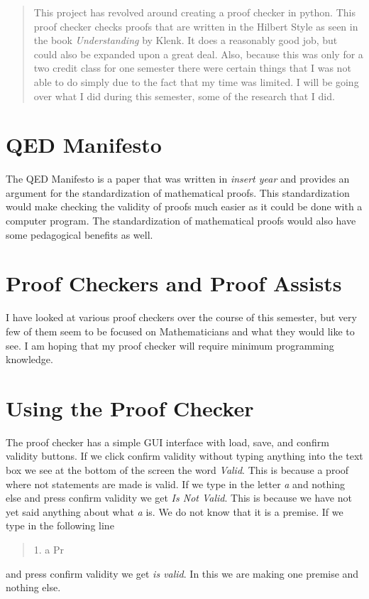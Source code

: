 \documentclass[12pt]{article}
\begin{document}
\begin{abstract}
This project has revolved around creating a proof checker in python. This proof checker checks proofs that are written in the Hilbert Style as seen in the book \emph{Understanding} by Klenk. It does a reasonably good job, but could also be expanded upon a great deal. Also, because this was only for a two credit class for one semester there were certain things that I was not able to do simply due to the fact that my time was limited. I will be going over what I did during this semester, some of the research that I did.
\end{abstract}

\section{QED Manifesto}
The QED Manifesto is a paper that was written in \emph{insert year} and provides an argument for the standardization of mathematical proofs. This standardization would make checking the validity of proofs much easier as it could be done with a computer program. The standardization of mathematical proofs would also have some pedagogical benefits as well. 

\section{Proof Checkers and Proof Assists}
I have looked at various proof checkers over the course of this semester, but very few of them seem to be focused on Mathematicians and what they would like to see. I am hoping that my proof checker will require minimum programming knowledge.

\section{Using the Proof Checker}
The proof checker has a simple GUI interface with load, save, and confirm validity buttons. If we click confirm validity without typing anything into the text box we see at the bottom of the screen the word \emph{Valid}. This is because a proof where not statements are made is valid. If we type in the letter \emph{a} and nothing else and press confirm validity we get \emph{Is Not Valid}. This is because we have not yet said anything about what \emph{a} is. We do not know that it is a premise. If we type in the following line 
\begin{quote}
1.  a    Pr
\end{quote}
and press confirm validity we get \emph{is valid}. In this we are making one premise and nothing else.
\end{document}
